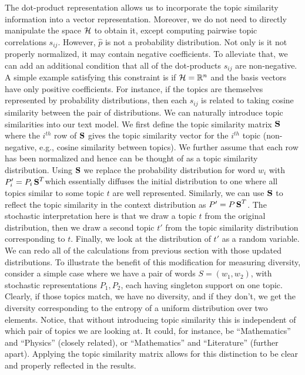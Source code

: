 \documentclass{article} %
\begin{document}
The dot-product representation allows us to incorporate the topic
similarity information into a vector representation. Moreover, we do
not need to directly manipulate the space ${\mathcal H}$ to obtain it, except
computing pairwise topic correlations $s_{ij}$. However,
$\widehat{p}$ is not a probability distribution. Not only is it not
properly normalized, it may contain negative coefficients. To
alleviate that, we can add an additional condition that all of the
dot-products $s_{ij}$ are non-negative. A simple example satisfying
this constraint is if ${\mathcal H}={\mathbb R}^n$ and the basis vectors have only
positive coefficients. For instance, if the topics are
themselves represented by probability distributions, then each $s_{ij}$
is related to taking cosine similarity between the pair of
distributions. 
We can naturally introduce topic similarities into our text model. We
first define the topic similarity matrix $\operatorname{\mathbf{S}}$ 
where the $i^{th}$ row of $\operatorname{\mathbf{S}}$ gives the topic similarity vector for
the $i^{th}$ topic (non-negative, e.g., cosine similarity between
topics). We further assume that each row has been normalized 
and hence can be thought of as a topic similarity distribution. Using
$\operatorname{\mathbf{S}}$ we replace the probability distribution for word $w_i$ with $P'_i=P_i\operatorname{\mathbf{S}}^T$which essentially diffuses the initial distribution to
one where  all topics similar to some topic $t$ are well
represented. Similarly, we can use $\operatorname{\mathbf{S}}$ to reflect the topic
similarity in the context distribution as $P' = P\operatorname{\mathbf{S}}^T$. The
stochastic interpretation here is that we draw a topic $t$ from the
original distribution, then we draw a second topic $t'$ from the
topic similarity distribution corresponding to $t$. Finally, we look
at the distribution of $t'$ as a random variable. We can redo
all of the calculations from previous section with those updated
distributions. To illustrate the benefit of this modification for
measuring diversity, consider a simple case where we have a pair of words
$S=(w_1,w_2)$, with stochastic representations $P_1,P_2$, each having
singleton support on one topic. Clearly, if those topics match, we
have no diversity, and if they don't, we get the diversity
corresponding to the entropy of a uniform distribution over two
elements. Notice, that without introducing topic similarity this is
independent of which pair of topics we are looking at. It could, for
instance, be ``Mathematics'' and ``Physics'' (closely related), or
``Mathematics'' and ``Literature'' (further apart).  Applying the
topic similarity matrix allows for this distinction to be clear and properly
reflected in the results.
\end{document}

